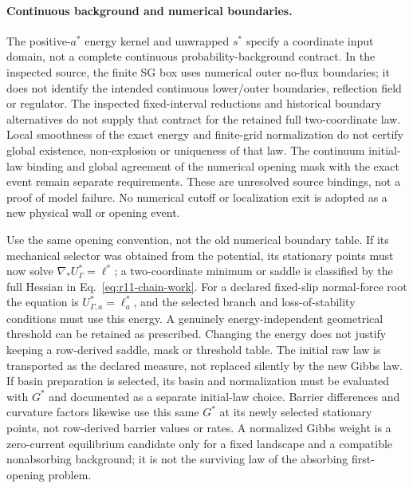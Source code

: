 \documentclass[11pt]{article}
\begin{document}
\paragraph{Continuous background and numerical boundaries.}
The positive-$a^*$ energy kernel and unwrapped $s^*$ specify a coordinate
input domain, not a complete continuous probability-background contract.
In the inspected source, the finite SG box uses numerical outer no-flux
boundaries; it does not identify the intended continuous lower/outer
boundaries, reflection field or regulator.
The inspected fixed-interval reductions and historical boundary alternatives
do not supply that contract for the retained full two-coordinate law.
Local smoothness of the exact energy and finite-grid normalization do not
certify global existence, non-explosion or uniqueness of that law.
The continuum initial-law binding and global agreement of the numerical
opening mask with the exact event remain separate requirements.
These are unresolved source bindings, not a proof of model failure.
No numerical cutoff or localization exit is adopted as a new physical wall
or opening event.

Use the same opening convention, not the old numerical boundary table.
If its mechanical selector was obtained from the potential, its stationary
points must now solve $\nabla_*U_\Gamma^*=\ell^*$; a two-coordinate minimum
or saddle is classified by the full Hessian in Eq.~\eqref{eq:r11-chain-work}.
For a declared fixed-slip normal-force root the equation is
$U_{\Gamma,a}^*=\ell_a^*$, and the selected branch and loss-of-stability
conditions must use this energy. A genuinely energy-independent geometrical
threshold can be retained as prescribed. Changing the energy does not justify
keeping a row-derived saddle, mask or threshold table. The initial raw law
is transported as the declared measure, not replaced silently by the new
Gibbs law. If basin preparation is selected, its basin and normalization must
be evaluated with $G^*$ and documented as a separate initial-law choice.
Barrier differences and curvature factors likewise use this same $G^*$ at
its newly selected stationary points, not row-derived barrier values or rates.
A normalized Gibbs weight is a zero-current equilibrium candidate only for
a fixed landscape and a compatible nonabsorbing background; it is not the
surviving law of the absorbing first-opening problem.
\end{document}
